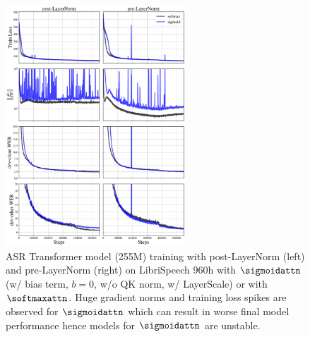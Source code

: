 \begin{figure}[t]
    \centering
    
        \centering
        \includegraphics[width=0.6\textwidth]{
            figures/asr_appendix
        }
        \caption{
            ASR Transformer model (255M) training with post-LayerNorm (left) and pre-LayerNorm (right) on LibriSpeech 960h with $\sigmoidattn$ (w/ bias term, $b=0$, w/o QK norm, w/ LayerScale) or with $\softmaxattn$. Huge gradient norms and training loss spikes are observed for $\sigmoidattn$ which can result in worse final model performance hence models for $\sigmoidattn$ are unstable.}
        \label{fig:asr-spikes}
        \vspace{-0.4cm}
\end{figure}

